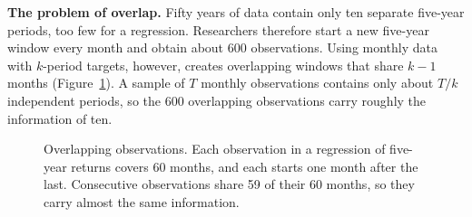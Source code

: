 \textbf{The problem of overlap.} Fifty years of data contain only ten separate five-year periods, too few for a regression. Researchers therefore start a new five-year window every month and obtain about 600 observations. Using monthly data with $k$-period targets, however, creates overlapping windows that share $k-1$ months (Figure~\ref{fig:03-overlap}). A sample of $T$ monthly observations contains only about $T/k$ independent periods, so the 600 overlapping observations carry roughly the information of ten.

\begin{figure}[!htbp]
  \centering
\caption{Overlapping observations. Each observation in a regression of five-year returns covers 60 months, and each starts one month after the last. Consecutive observations share 59 of their 60 months, so they carry almost the same information.}
\label{fig:03-overlap}
\end{figure}

